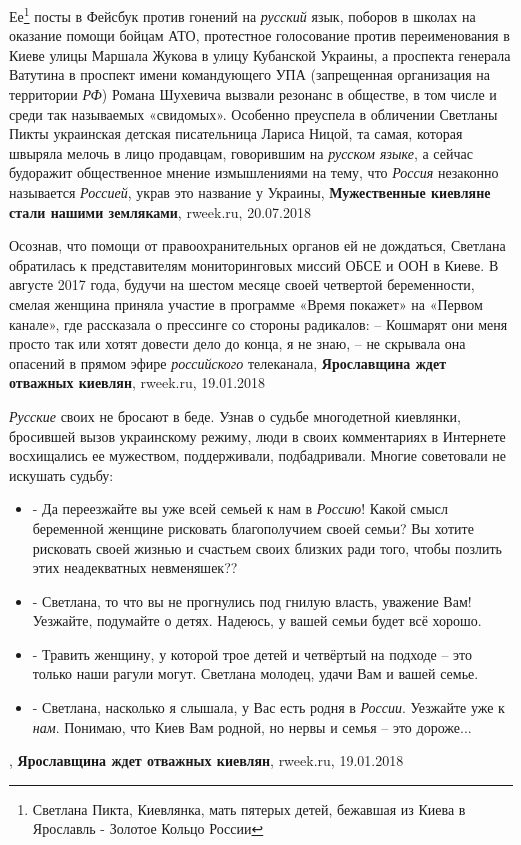 Ее\footnote{Светлана Пикта, Киевлянка, мать пятерых детей, бежавшая из Киева в
Ярославль - Золотое Кольцо России} посты в Фейсбук против гонений на \emph{русский}
язык, поборов в школах на оказание помощи бойцам АТО, протестное голосование
против переименования в Киеве улицы Маршала Жукова в улицу Кубанской Украины, а
проспекта генерала Ватутина в проспект имени командующего УПА (запрещенная
организация на территории \emph{РФ}) Романа Шухевича вызвали резонанс в обществе, в
том числе и среди так называемых «свидомых». Особенно преуспела в обличении
Светланы Пикты украинская детская писательница Лариса Ницой, та самая, которая
швыряла мелочь в лицо продавцам, говорившим на \emph{русском языке}, а сейчас
будоражит общественное мнение измышлениями на тему, что \emph{Россия} незаконно
называется \emph{Россией}, украв это название у Украины,
\textbf{Мужественные киевляне стали нашими земляками}, rweek.ru, 20.07.2018

Осознав, что помощи от правоохранительных органов ей не дождаться, Светлана
обратилась к представителям мониторинговых миссий ОБСЕ и ООН в Киеве. В августе
2017 года, будучи на шестом месяце своей четвертой беременности, смелая женщина
приняла участие в программе «Время покажет» на «Первом канале», где рассказала
о прессинге со стороны радикалов: – Кошмарят они меня просто так или хотят
довести дело до конца, я не знаю, – не скрывала она опасений в прямом эфире
\emph{российского} телеканала,
\textbf{Ярославщина ждет отважных киевлян}, rweek.ru, 19.01.2018

\emph{Русские} своих не бросают в беде. Узнав о судьбе многодетной киевлянки,
бросившей вызов украинскому режиму, люди в своих комментариях в Интернете
восхищались ее мужеством, поддерживали, подбадривали. Многие советовали не
искушать судьбу:
\begin{itemize}
\item - Да переезжайте вы уже всей семьей к нам в \emph{Россию}! Какой смысл беременной женщине рисковать благополучием своей семьи? Вы хотите рисковать своей жизнью и счастьем своих близких ради того, чтобы позлить этих неадекватных невменяшек??
\item - Светлана, то что вы не прогнулись под гнилую власть, уважение Вам! Уезжайте, подумайте о детях. Надеюсь, у вашей семьи будет всё хорошо.
\item - Травить женщину, у которой трое детей и четвёртый на подходе – это только наши рагули могут. Светлана молодец, удачи Вам и вашей семье.
\item - Светлана, насколько я слышала, у Вас есть родня в \emph{России}. Уезжайте уже к \emph{нам}. Понимаю, что Киев Вам родной, но нервы и семья – это дороже...
\end{itemize},
\textbf{Ярославщина ждет отважных киевлян}, rweek.ru, 19.01.2018

